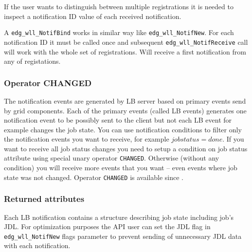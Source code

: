 If the user wants to distinguish between multiple registrations it is
needed to inspect a notification ID value of each received notification.

A \verb'edg_wll_NotifBind' works in similar way like
\verb'edg_wll_NotifNew'. For each notification ID it must be called
once and subsequent \verb'edg_wll_NotifReceive' call will work with
the whole set of registrations. Will receive a first notification from
any of registations.

\subsubsection{Operator CHANGED}
%
The notification events are generated by LB server based on primary
events send by grid components. Each of the primary events (called LB
events) generates one notification event to be possibly sent to the
client but not each LB event for example changes the job state. You
can use notification conditions to filter only the notification
events you want to receive, for example $job status = done$. If you
want to receive all job status changes you need to setup a condition
on job status attribute using special unary operator
\verb'CHANGED'. Otherwise (without any condition) you will receive
more events that you want -- even events where job state was not
changed. Operator \verb'CHANGED' is available since .

\subsubsection{Returned attributes}
%
Each LB notification contains a structure describing job state
including job's JDL. For optimization purposes the API user can set
the JDL flag in \verb'edg_wll_NotifNew' flags parameter to prevent
sending of unnecessary JDL data with each notification.

